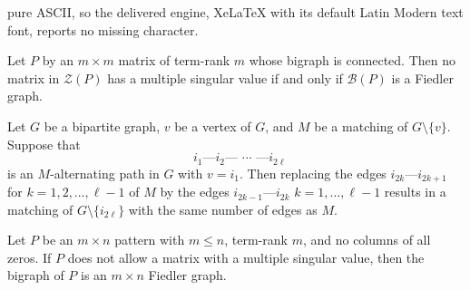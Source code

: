 \documentclass[10pt,a4paper]{amsart}
\begin{document}
pure ASCII, so the delivered engine, XeLaTeX with its default Latin Modern text font, reports no missing character.
\begin{observation}
\label{fiedlergraphdistinct}
Let $P$ by an $m\times m$ matrix of term-rank $m$ whose bigraph is connected.  Then no matrix in $\mathcal{Z}(P)$ has a multiple singular value if and only if $\mathcal{B}(P)$
is a Fiedler graph. 
\end{observation}

\begin{observation}
\label{alternating}
Let $G$ be a bipartite graph, $v$ be a vertex of $G$, and  $M$ be a matching of $G\setminus \{v\}$.
Suppose that 
\[ 
\mbox{ $i_1$---$i_2$--- $\cdots$ ---$i_{2\ell}$}
\]
is an $M$-alternating path in $G$ with $v=i_1$.
Then replacing the edges $i_{2k}$---$i_{2k+1}$ 
for $k=1,2,\ldots, \ell-1$ of $M$ by the edges 
$i_{2k-1}$---$i_{2k}$ $k=1,\ldots, \ell-1$
results in a matching of $G\setminus \{i_{2\ell}\}$ with the same number of edges as $M$. 
\end{observation}

\begin{theorem}
\label{bcaterpillars}
Let $P$ be an $m\times n$ pattern with $m\leq n$, term-rank $m$, 
and no columns of all zeros. If $P$ does not allow a matrix with a multiple singular value, then the bigraph of $P$ 
is an $m\times n$ Fiedler graph. 
\end{theorem}
\end{document}
